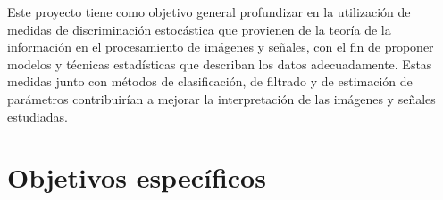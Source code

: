 \documentclass[11pt]{article}
\begin{document}



Este proyecto tiene como objetivo general profundizar en la utilización de medidas de discriminación estocástica que provienen de la teoría de la información en el procesamiento de imágenes y señales, con el fin de proponer modelos y técnicas estadísticas que describan los datos adecuadamente. Estas medidas junto con métodos de clasificación, de filtrado y de estimación de parámetros contribuirían a mejorar la interpretación de las imágenes y señales estudiadas.


\section{Objetivos específicos}
\end{document}
